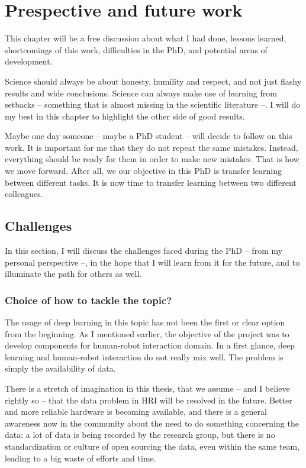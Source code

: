 \chapter{Prespective and future work} \label{ch:discussion}
\minitoc%

This chapter will be a free discussion about what I had done, lessons learned, shortcomings of this work, difficulties in the PhD, and potential areas of development.

Science should always be about honesty, humility and respect, and not just flashy results and wide conclusions. Science can always make use of learning from setbacks -- something that is almost missing in the scientific literature --. I will do my best in this chapter to highlight the other side of good results.

Maybe one day someone -- maybe a PhD student -- will decide to follow on this work. It is important for me that they do not repeat the same mistakes. Instead, everything should be ready for them in order to make new mistakes. That is how we move forward. After all, we our objective in this PhD is transfer learning between different tasks. It is now time to transfer learning between two different colleagues.

\clearpage

\section{Challenges}
  \par In this section, I will discuss the challenges faced during the PhD -- from my personal perspective --, in the hope that I will learn from it for the future, and to illuminate the path for others as well.

  \subsection{Choice of how to tackle the topic?}
  \par The usage of deep learning in this topic has not been the first or clear option from the beginning. As I mentioned earlier, the objective of the project was to develop components for human-robot interaction domain. In a first glance, deep learning and human-robot interaction do not really mix well. The problem is simply the availability of data.

  \par There is a stretch of imagination in this thesis, that we assume -- and I believe rightly so -- that the data problem in HRI will be resolved in the future. Better and more reliable hardware is becoming available, and there is a general awareness now in the community about the need to do something concerning the data: a lot of data is being recorded by the research group, but there is no standardization or culture of open sourcing the data, even within the same team, leading to a big waste of efforts and time.


